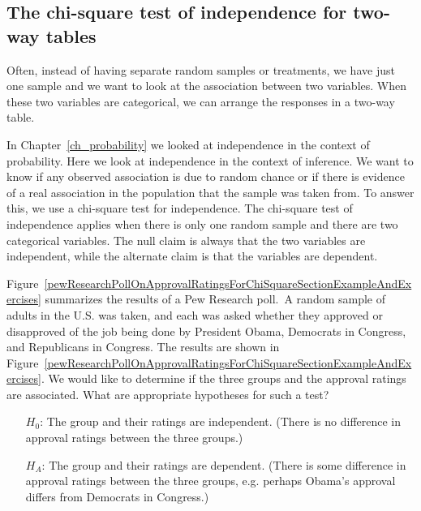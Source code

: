 \D{\newpage}

\subsection{The chi-square test of independence for two-way tables}

Often, instead of having separate random samples or treatments, we have just one sample and we want to look at the association between two variables.  When these two variables are categorical, we can arrange the responses in a two-way table.  

In Chapter~\ref{ch_probability} we looked at independence in the context of probability.  Here we look at independence in the context of inference.  We want to know if any observed association is due to random chance or if there is evidence of a real association in the population that the sample was taken from.  To answer this, we use a chi-square test for independence.  The chi-square test of independence applies when there is only one random sample and there are two categorical variables.  The null claim is always that the two variables are independent, while the alternate claim is that the variables are dependent.


\begin{examplewrap}
\begin{nexample}
{Figure~\ref{pewResearchPollOnApprovalRatingsForChiSquareSectionExampleAndExercises} summarizes the results of a Pew Research poll.\footnotemark\, A random sample of adults in the U.S. was taken, and each was asked whether they approved or disapproved of the job being done by President Obama, Democrats in Congress, and Republicans in Congress.  The results are shown in Figure~\ref{pewResearchPollOnApprovalRatingsForChiSquareSectionExampleAndExercises}.  We would like to determine if the three groups and the approval ratings are associated. What are appropriate hypotheses for such a test?\label{hypothesisTestSetupForPewResearchPollOnApprovalRatingsForChiSquareSection}}
\begin{itemize}
\item[$H_0$:] The group and their ratings are independent. (There is no difference in approval ratings between the three groups.)
\item[$H_A$:] The group and their ratings are dependent. (There is some difference in approval ratings between the three groups, e.g. perhaps Obama's approval differs from Democrats in Congress.)
\end{itemize}
\end{nexample}
\end{examplewrap}

